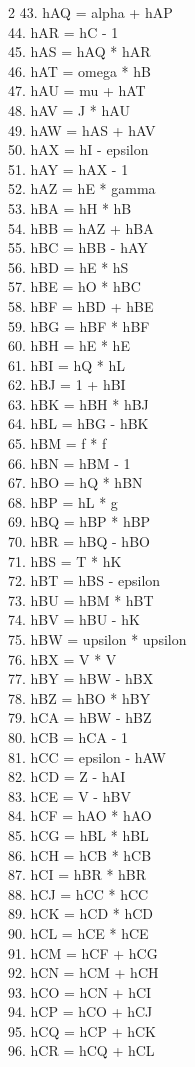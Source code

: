 \documentclass[10pt]{article}
\begin{document}
\begin{multicols}{2}
43. hAQ = alpha + hAP\\
44. hAR = hC - 1\\
45. hAS = hAQ * hAR\\
46. hAT = omega * hB\\
47. hAU = mu + hAT\\
48. hAV = J * hAU\\
49. hAW = hAS + hAV\\
50. hAX = hI - epsilon\\
51. hAY = hAX - 1\\
52. hAZ = hE * gamma\\
53. hBA = hH * hB\\
54. hBB = hAZ + hBA\\
55. hBC = hBB - hAY\\
56. hBD = hE * hS\\
57. hBE = hO * hBC\\
58. hBF = hBD + hBE\\
59. hBG = hBF * hBF\\
60. hBH = hE * hE\\
61. hBI = hQ * hL\\
62. hBJ = 1 + hBI\\
63. hBK = hBH * hBJ\\
64. hBL = hBG - hBK\\
65. hBM = f * f\\
66. hBN = hBM - 1\\
67. hBO = hQ * hBN\\
68. hBP = hL * g\\
69. hBQ = hBP * hBP\\
70. hBR = hBQ - hBO\\
71. hBS = T * hK\\
72. hBT = hBS - epsilon\\
73. hBU = hBM * hBT\\
74. hBV = hBU - hK\\
75. hBW = upsilon * upsilon\\
76. hBX = V * V\\
77. hBY = hBW - hBX\\
78. hBZ = hBO * hBY\\
79. hCA = hBW - hBZ\\
80. hCB = hCA - 1\\
81. hCC = epsilon - hAW\\
82. hCD = Z - hAI\\
83. hCE = V - hBV\\
84. hCF = hAO * hAO\\
85. hCG = hBL * hBL\\
86. hCH = hCB * hCB\\
87. hCI = hBR * hBR\\
88. hCJ = hCC * hCC\\
89. hCK = hCD * hCD\\
90. hCL = hCE * hCE\\
91. hCM = hCF + hCG\\
92. hCN = hCM + hCH\\
93. hCO = hCN + hCI\\
94. hCP = hCO + hCJ\\
95. hCQ = hCP + hCK\\
96. hCR = hCQ + hCL\\

\end{multicols}
\end{document}
